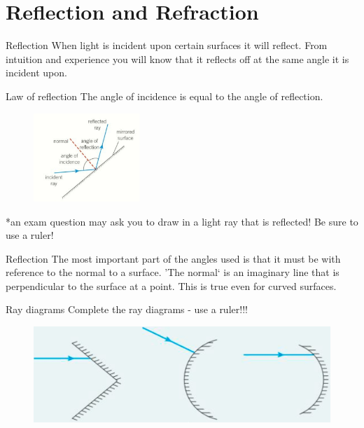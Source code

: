\documentclass[../Main.tex]{subfiles}
\begin{document}
\author{Reflection and Refraction} %
\date{Year 1 Topic 17} %

\section{Reflection and Refraction} %

\begin{frame}{Reflection}
    When light is incident upon certain surfaces it will reflect. From intuition and experience you will know that it reflects off at the same angle it is incident upon.
    \pause
    \begin{block}{Law of reflection}
    The angle of incidence is equal to the angle of reflection.
    \begin{figure}
        \centering
        \includegraphics[width=4cm]{Waves_Images/lawofreflection.jpg}
    \end{figure}
    \end{block}
    *an exam question may ask you to draw in a light ray that is reflected! Be sure to use a ruler!
\end{frame}

\begin{frame}{Reflection}
    The most important part of the angles used is that it must be with reference to the normal to a surface. 'The normal` is an imaginary line that is perpendicular to the surface at a point. This is true even for curved surfaces. 
    
    \begin{exampleblock}{Ray diagrams}
    Complete the ray diagrams - use a ruler!!!
    \begin{figure}
        \centering
        \includegraphics[width=\textwidth]{Waves_Images/raydiagrams.jpg}
    \end{figure}
    \end{exampleblock}
\end{frame}
\end{document}
